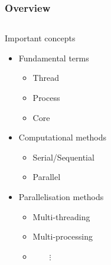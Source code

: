 \begin{frame}
\frametitle{Overview}

\begin{columns}
	\begin{exampleblock}{Important concepts}
		\begin{itemize}
			\item Fundamental terms
			\begin{itemize}
				\item Thread
				\item Process
				\item Core
			\end{itemize}
			\item Computational methods
			\begin{itemize}
				\item Serial/Sequential
				\item Parallel
			\end{itemize}
			\item Parallelisation methods
			\begin{itemize}
				\item Multi-threading
				\item Multi-processing
				\item[] $\qquad \vdots$
			\end{itemize}
		\end{itemize}
	\end{exampleblock}
	

\end{columns}
\end{frame}
